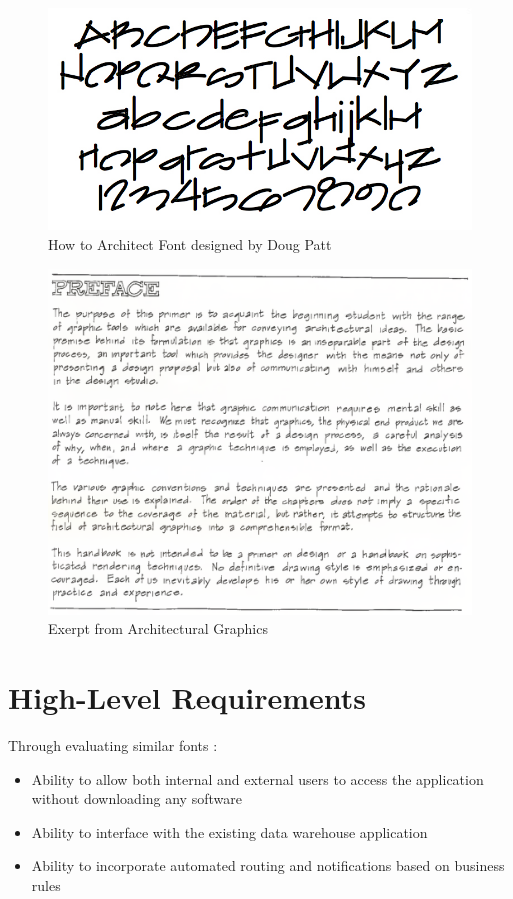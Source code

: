 \documentclass[a4paper]{article}
\begin{document}
    \begin{figure}[h]
            \includegraphics[width=1\textwidth]{ArchitectsFont.jpg}
            \caption{How to Architect Font designed by Doug Patt}
        \label{fig:architects}
    \end{figure}
    
    \begin{figure}[h]
    	\includegraphics[width=1\textwidth]{Ching.png}
    	\caption{Exerpt from Architectural Graphics\cite{architecturalgraphics}}
    \end{figure}
\pagebreak 
\section{High-Level Requirements} %
Through evaluating similar fonts :
\begin{itemize}
    \item Ability to allow both internal and external users to access the application without downloading any software 
    \item Ability to interface with the existing data warehouse application 
    \item Ability to incorporate automated routing and notifications based on business rules
\end{itemize}
\end{document}
